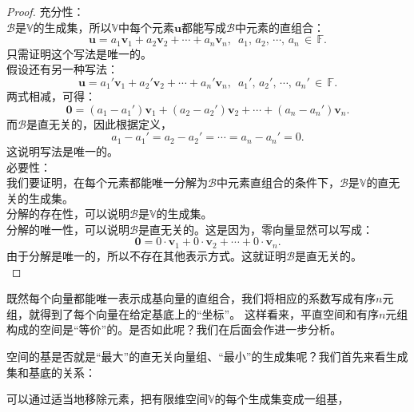 \documentclass[12pt,UTF8]{ctexbook}
\begin{document}
\begin{proof} %
    充分性：\\
    $\mathcal{B}$是$\mathbb{V}$的生成集，所以$\mathbb{V}$中每个元素$\mathbf{u}$都能写成$\mathcal{B}$中元素的直组合：
    $$ \mathbf{u} = a_1\mathbf{v}_1 +a_2 \mathbf{v}_2 + \cdots + a_n\mathbf{v}_n, \,\,\, a_1,\,a_2,\,\cdots,\, a_n \,\in\,\mathbb{F}.$$
    只需证明这个写法是唯一的。\\
    假设还有另一种写法：
    $$ \mathbf{u} = a_1'\mathbf{v}_1 +a_2' \mathbf{v}_2 + \cdots + a_n'\mathbf{v}_n, \,\,\, a_1' ,\,a_2' ,\,\cdots,\, a_n' \,\in\,\mathbb{F}.$$
    两式相减，可得：
    $$ \mathbf{0} = (a_1 - a_1')\mathbf{v}_1 + (a_2 - a_2') \mathbf{v}_2 + \cdots + (a_n - a_n')\mathbf{v}_n.$$
    而$\mathcal{B}$是直无关的，因此根据定义，
    $$ a_1 - a_1' = a_2 - a_2' = \cdots = a_n - a_n' = 0.$$
    这说明写法是唯一的。\\
    必要性：\\
    我们要证明，在每个元素都能唯一分解为$\mathcal{B}$中元素直组合的条件下，$\mathcal{B}$是$\mathbb{V}$的直无关的生成集。\\
    分解的存在性，可以说明$\mathcal{B}$是$\mathbb{V}$的生成集。\\ 
    分解的唯一性，可以说明$\mathcal{B}$是直无关的。这是因为，零向量显然可以写成：
    $$ \mathbf{0} = 0\cdot\mathbf{v}_1 + 0\cdot\mathbf{v}_2 + \cdots + 0\cdot\mathbf{v}_n.$$
    由于分解是唯一的，所以不存在其他表示方式。这就证明$\mathcal{B}$是直无关的。\\
\end{proof}


既然每个向量都能唯一表示成基向量的直组合，我们将相应的系数写成有序$n$元组，就得到了每个向量在给定基底上的“坐标”。
这样看来，平直空间和有序$n$元组构成的空间是“等价”的。是否如此呢？我们在后面会作进一步分析。

空间的基是否就是“最大”的直无关向量组、“最小”的生成集呢？我们首先来看生成集和基底的关系：

\begin{pp}\label{pp:2_6}
    可以通过适当地移除元素，把有限维空间$\mathbb{V}$的每个生成集变成一组基，
\end{pp}
\end{document}
